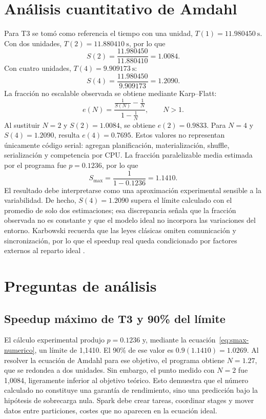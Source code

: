 \documentclass[11pt,a4paper]{article}
\begin{document}
\section{Análisis cuantitativo de Amdahl}
Para T3 se tomó como referencia el tiempo con una unidad, $T(1)=\SI{11.980450}{\second}$. Con dos unidades, $T(2)=\SI{11.880410}{\second}$, por lo que
\begin{equation}
S(2)=\frac{11.980450}{11.880410}=1.0084.
\label{eq:s2}
\end{equation}
Con cuatro unidades, $T(4)=\SI{9.909173}{\second}$:
\begin{equation}
S(4)=\frac{11.980450}{9.909173}=1.2090.
\label{eq:s4}
\end{equation}
La fracción no escalable observada se obtiene mediante Karp--Flatt:
\begin{equation}
e(N)=\frac{\frac{1}{S(N)}-\frac{1}{N}}{1-\frac{1}{N}},\qquad N>1.
\label{eq:karpflatt}
\end{equation}
Al sustituir $N=2$ y $S(2)=1.0084$, se obtiene $e(2)=0.9833$. Para $N=4$ y $S(4)=1.2090$, resulta $e(4)=0.7695$. Estos valores no representan únicamente código serial: agregan planificación, materialización, shuffle, serialización y competencia por CPU. La fracción paralelizable media estimada por el programa fue $p=0.1236$, por lo que
\begin{equation}
S_{\max}=\frac{1}{1-0.1236}=1.1410.
\label{eq:smax-numerico}
\end{equation}
El resultado debe interpretarse como una aproximación experimental sensible a la variabilidad. De hecho, $S(4)=1.2090$ supera el límite calculado con el promedio de solo dos estimaciones; esa discrepancia señala que la fracción observada no es constante y que el modelo ideal no incorpora las variaciones del entorno. Karbowski recuerda que las leyes clásicas omiten comunicación y sincronización, por lo que el speedup real queda condicionado por factores externos al reparto ideal \cite{karbowski2025}.

\section{Preguntas de análisis}
\subsection{Speedup máximo de T3 y 90\% del límite}
El cálculo experimental produjo $p=0.1236$ y, mediante la ecuación~\eqref{eq:smax-numerico}, un límite de 1,1410. El 90\% de ese valor es $0.9(1.1410)=1.0269$. Al resolver la ecuación de Amdahl para ese objetivo, el programa obtiene $N=1.27$, que se redondea a dos unidades. Sin embargo, el punto medido con $N=2$ fue 1,0084, ligeramente inferior al objetivo teórico. Esto demuestra que el número calculado no constituye una garantía de rendimiento, sino una predicción bajo la hipótesis de sobrecarga nula. Spark debe crear tareas, coordinar stages y mover datos entre particiones, costes que no aparecen en la ecuación ideal.
\end{document}
